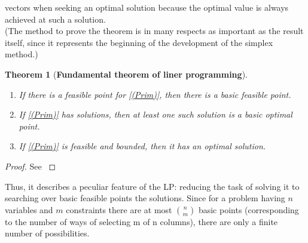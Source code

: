 \documentclass[a4paper,10 pt,titlepage,twoside]{book}
\theoremstyle{plain}
\newtheorem{thm}{Theorem}[chapter]
\theoremstyle{definition}
\theoremstyle{remark}
\begin{document}
vectors when seeking an optimal solution because the optimal
value is always achieved at such a solution.\\ (The method to prove the theorem is in many respects as important as the result itself, since it represents the beginning of the development of the simplex
method.)
\begin{thm}[\textbf{Fundamental theorem of liner programming}]\label{Fund}
\begin{enumerate}
	\
\item If there is a feasible point for \ref{(Prim)}, then there is a basic feasible point.
\item If \ref{(Prim)} has solutions, then at least one such solution is a basic optimal point.
\item If \ref{(Prim)} is feasible and bounded, then it has an optimal solution.
\end{enumerate}
\end{thm}
\begin{proof}
	See \cite{LP}
\end{proof}
Thus, it describes a peculiar feature of the LP: reducing the task of solving it to searching over basic feasible points the solutions. Since for a problem having $n$ variables and $m$ constraints there are at most ${n}\choose{m}$ basic points (corresponding to the number of ways of selecting m of n columns), there are only a finite number of possibilities. 
\end{document}
